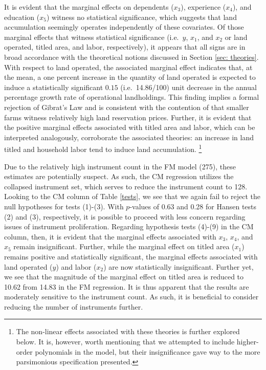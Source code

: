 \documentclass[english]{article}
\begin{document}
It is evident that the marginal effects on dependents ($x_3$), experience 
($x_4$), and education ($x_5$) witness no statistical significance, which 
suggests that land accumulation seemingly operates independently of these 
covariates.
Of those marginal effects that witness statistical significance (i.e.\ $y$, $x_1$, 
and $x_2$ or land operated, titled area, and labor, respectively), it appears that 
all signs are in broad accordance with the theoretical notions discussed in 
Section \ref{sec: theories}.
With respect to land operated, the associated marginal effect indicates that, at
the mean, a one percent increase in the quantity of land operated is expected to 
induce a statistically significant $0.15$ (i.e.\ 14.86/100) unit decrease in the 
annual percentage growth rate of operational landholdings. 
This finding implies a formal rejection of Gibrat's Law and is consistent with 
the contention of \citet{carter1993} that smaller farms witness relatively 
high land reservation prices.
Further, it is evident that the positive marginal effects associated with titled 
area and labor, which can be interpreted analogously, corroborate the 
associated theories: an increase in land titled and household labor tend to 
induce land accumulation.%
\footnote{The non-linear effects associated with these theories is further 
explored below. 
It is, however, worth mentioning that we attempted to include higher-order
polynomials in the model, but their insignificance gave way to the more 
parsimonious specification presented.}

Due to the relatively high instrument count in the FM model (275), these
estimates are potentially suspect.
As such, the CM regression utilizes the collapsed instrument set, which
serves to reduce the instrument count to 128.
Looking to the CM column of Table \ref{tests}, we see that we again fail
to reject the null hypotheses for tests (1)-(3).
With $p$-values of 0.63 and 0.28 for Hansen tests (2) and (3), respectively, 
it is possible to proceed with less concern regarding issues of instrument 
proliferation.
Regarding hypothesis tests (4)-(9) in the CM column, then, it is evident that
the marginal effects associated with $x_3$, $x_4$, and $x_5$ remain 
insignificant.
Further, while the marginal effect on titled area ($x_1$) remains positive
and statistically significant, the marginal effects associated with land operated
($y$) and labor ($x_2$) are now statistically insignificant.
Further yet, we see that the magnitude of the marginal effect on titled area
is reduced to 10.62 from 14.83 in the FM regression.
It is thus apparent that the results are moderately sensitive to the instrument
count.
As such, it is beneficial to consider reducing the number of instruments further.
\end{document}
